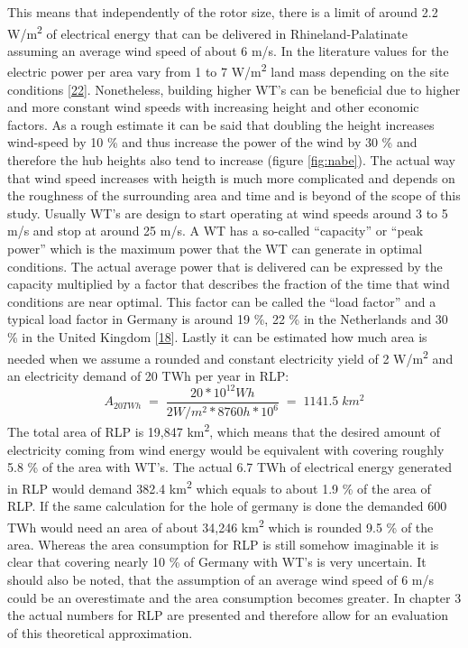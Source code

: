 \documentclass[a4paper,11pt]{article}
\begin{document}
This means that independently of the rotor size, there is a limit of around 2.2 W/m\textsuperscript{2} of electrical energy that can be delivered in Rhineland-Palatinate assuming an average wind speed of about 6 m/s. In the literature values for the electric power per area vary from 1 to 7 W/m\textsuperscript{2} land mass depending on the site conditions {[}\protect\hyperlink{ref-SvenLinow.2020}{22}{]}. Nonetheless, building higher WT's can be beneficial due to higher and more constant wind speeds with increasing height and other economic factors. As a rough estimate it can be said that doubling the height increases wind-speed by 10 \% and thus increase the power of the wind by 30 \% and therefore the hub heights also tend to increase (figure \ref{fig:nabe}). The actual way that wind speed increases with heigth is much more complicated and depends on the roughness of the surrounding area and time and is beyond of the scope of this study. Usually WT's are design to start operating at wind speeds around 3 to 5 m/s and stop at around 25 m/s. A WT has a so-called ``capacity'' or ``peak power'' which is the maximum power that the WT can generate in optimal conditions. The actual average power that is delivered can be expressed by the capacity multiplied by a factor that describes the fraction of the time that wind conditions are near optimal. This factor can be called the ``load factor'' and a typical load factor in Germany is around 19 \%, 22 \% in the Netherlands and 30 \% in the United Kingdom {[}\protect\hyperlink{ref-DavidJCMacKay.2009}{18}{]}. Lastly it can be estimated how much area is needed when we assume a rounded and constant electricity yield of 2 W/m\textsuperscript{2} and an electricity demand of 20 TWh per year in RLP:
\begin{equation}
A_{20TWh}\;=\;\frac{20 * 10^{12} Wh}{2W/m^2 * 8760h * 10^6}\;=\;1141.5\;km^2
\end{equation}
The total area of RLP is 19,847 km\textsuperscript{2}, which means that the desired amount of electricity coming from wind energy would be equivalent with covering roughly 5.8 \% of the area with WT's. The actual 6.7 TWh of electrical energy generated in RLP would demand 382.4 km\textsuperscript{2} which equals to about 1.9 \% of the area of RLP. If the same calculation for the hole of germany is done the demanded 600 TWh would need an area of about 34,246 km\textsuperscript{2} which is rounded 9.5 \% of the area. Whereas the area consumption for RLP is still somehow imaginable it is clear that covering nearly 10 \% of Germany with WT's is very uncertain. It should also be noted, that the assumption of an average wind speed of 6 m/s could be an overestimate and the area consumption becomes greater. In chapter 3 the actual numbers for RLP are presented and therefore allow for an evaluation of this theoretical approximation.
\end{document}
